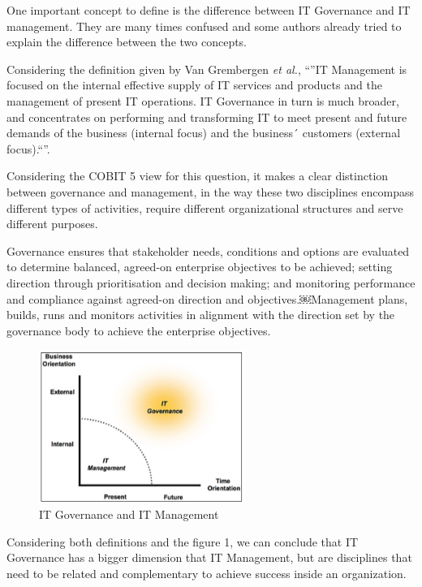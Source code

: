 One important concept to define is the difference between IT Governance and IT management. They are many times confused and some authors already tried to explain the difference between the two concepts.\par
Considering the definition given by Van Grembergen \textit{et al.}, ``''IT Management is focused on the internal effective supply of IT services and products and the management of present IT operations. IT Governance in turn is much broader, and concentrates on performing and transforming IT to meet present and future demands of the business (internal focus) and the business´ customers (external focus).``''.\par
 Considering the COBIT 5 view for this question, it makes a clear distinction between governance and management, in the way these two disciplines encompass different types of activities, require different organizational structures and serve different purposes.\par
 Governance ensures that stakeholder needs, conditions and options are evaluated to determine balanced, agreed-on enterprise objectives to be achieved; setting direction through prioritisation and decision making; and monitoring performance and compliance against agreed-on direction and objectives.￼Management plans, builds, runs and monitors activities in alignment with the direction set by the governance body to achieve the enterprise objectives.\par

\begin{figure}
\centering
\includegraphics[width=0.6\textwidth]{img/ITGovernanceAndManagement.png}
\caption{IT Governance and IT Management}
\end{figure}


 Considering both definitions and the figure 1, we can conclude that IT Governance has a bigger dimension that IT Management, but are disciplines that need to be related and complementary to achieve success inside an organization.

